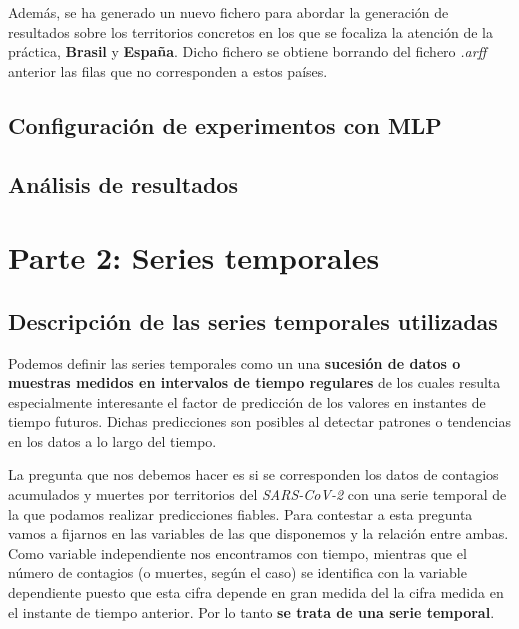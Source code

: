 \documentclass[12pt,a4paper, xcolor=table]{article}
\begin{document}
    Además, se ha generado un nuevo fichero para abordar la generación de resultados sobre los territorios concretos en los que se focaliza la atención de la práctica, \textbf{Brasil} y \textbf{España}. Dicho fichero se obtiene borrando del fichero \textit{.arff} anterior las filas que no corresponden a estos países.

    \subsection{Configuración de experimentos con MLP}

    \subsection{Análisis de resultados}

    \newpage    
    \section{Parte 2: Series temporales}
    
    \subsection{Descripción de las series temporales utilizadas}
        
        Podemos definir las series temporales como un una \textbf{sucesión de datos o muestras medidos en intervalos de tiempo regulares} de los cuales resulta especialmente interesante el factor de predicción de los valores en instantes de tiempo futuros. Dichas predicciones son posibles al detectar patrones o tendencias en los datos a lo largo del tiempo.
        
        \vspace{2mm}
    
        La pregunta que nos debemos hacer es si se corresponden los datos de contagios acumulados y muertes por territorios del  \textit{SARS-CoV-2} con una serie temporal de la que podamos realizar predicciones fiables. Para contestar a esta pregunta vamos a fijarnos en las variables de las que disponemos y la relación entre ambas. Como variable independiente nos encontramos con tiempo, mientras que el número de contagios (o muertes, según el caso) se identifica con la variable dependiente puesto que esta cifra depende en gran medida del la cifra medida en el instante de tiempo anterior. Por lo tanto \textbf{se trata de una serie temporal}.
           
\end{document}
